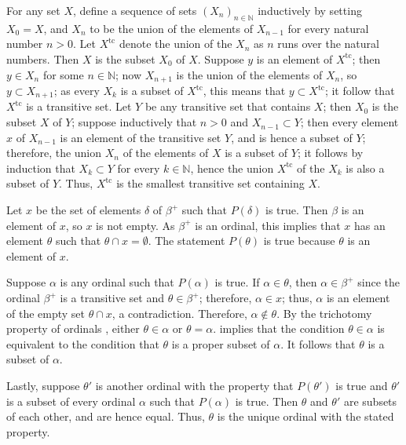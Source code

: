 \documentclass{article}
\begin{document}
\begin{solution}[\ref{exe:v7uvzogi}]
  \label{sol:qx891m3c}
  For any set \(X\), define a sequence of sets
  \((X_n)_{n \in \mathbb{N}}\) inductively by setting \(X_0 = X\), and
  \(X_n\) to be the union of the elements of \(X_{n - 1}\) for every
  natural number \(n > 0\).  Let \(X^{\mathrm{tc}}\) denote the union
  of the \(X_n\) as \(n\) runs over the natural numbers.  Then \(X\)
  is the subset \(X_0\) of \(X\).  Suppose \(y\) is an element of
  \(X^{\mathrm{tc}}\); then \(y \in X_n\) for some
  \(n \in \mathbb{N}\); now \(X_{n + 1}\) is the union of the elements
  of \(X_n\), so \(y \subset X_{n + 1}\); as every \(X_k\) is a subset
  of \(X^{\mathrm{tc}}\), this means that
  \(y \subset X^{\mathrm{tc}}\); it follow that \(X^{\mathrm{tc}}\) is
  a transitive set.  Let \(Y\) be any transitive set that contains
  \(X\); then \(X_0\) is the subset \(X\) of \(Y\); suppose
  inductively that \(n > 0\) and \(X_{n - 1} \subset Y\); then every
  element \(x\) of \(X_{n - 1}\) is an element of the transitive set
  \(Y\), and is hence a subset of \(Y\); therefore, the union \(X_n\)
  of the elements of \(X\) is a subset of \(Y\); it follows by
  induction that \(X_k \subset Y\) for every \(k \in \mathbb{N}\),
  hence the union \(X^{\mathrm{tc}}\) of the \(X_k\) is also a subset
  of \(Y\).  Thus, \(X^{\mathrm{tc}}\) is the smallest transitive set
  containing \(X\).
\end{solution}

\begin{solution}[\ref{exe:zgqzqjo2}]
  \label{sol:5my94p9w}
  Let \(x\) be the set of elements \(\delta\) of \(\beta^+\) such that
  \(P(\delta)\) is true.  Then \(\beta\) is an element of \(x\), so
  \(x\) is not empty.  As \(\beta^+\) is an ordinal, this implies that
  \(x\) has an element \(\theta\) such that
  \(\theta \cap x = \emptyset\).  The statement \(P(\theta)\) is true
  because \(\theta\) is an element of \(x\).

  Suppose \(\alpha\) is any ordinal such that \(P(\alpha)\) is true.
  If \(\alpha \in \theta\), then \(\alpha \in \beta^+\) since the
  ordinal \(\beta^+\) is a transitive set and \(\theta \in \beta^+\);
  therefore, \(\alpha \in x\); thus, \(\alpha\) is an element of the
  empty set \(\theta \cap x\), a contradiction.  Therefore,
  \(\alpha \notin \theta\).  By the trichotomy property of ordinals
  , either \(\theta \in \alpha\) or
  \(\theta = \alpha\).   implies that the condition
  \(\theta \in \alpha\) is equivalent to the condition that \(\theta\)
  is a proper subset of \(\alpha\).  It follows that \(\theta\) is a
  subset of \(\alpha\).

  Lastly, suppose \(\theta'\) is another ordinal with the property
  that \(P(\theta')\) is true and \(\theta'\) is a subset of every
  ordinal \(\alpha\) such that \(P(\alpha)\) is true.  Then \(\theta\)
  and \(\theta'\) are subsets of each other, and are hence equal.
  Thus, \(\theta\) is the unique ordinal with the stated property.
\end{solution}
\end{document}
